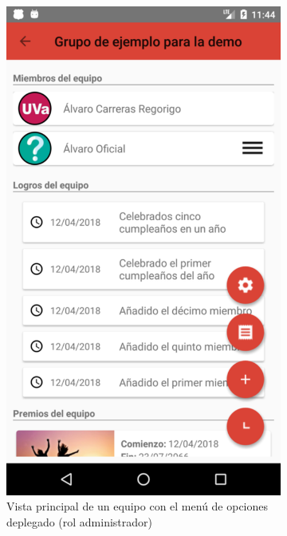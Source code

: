 \documentclass[twoside]{report}
\begin{document}
\begin{figure}[H]
\begin{center}
\begin{subfigure}[t]{.3\linewidth}
		\includegraphics[scale=0.2]{images/userguide/15.png}
		\caption{Vista principal de un equipo con  el menú de opciones deplegado (rol administrador)}
	\end{subfigure}\hspace{2mm}%
	\begin{subfigure}[t]{.3\linewidth}

\end{subfigure}
\end{center}
\end{figure}
\end{document}
